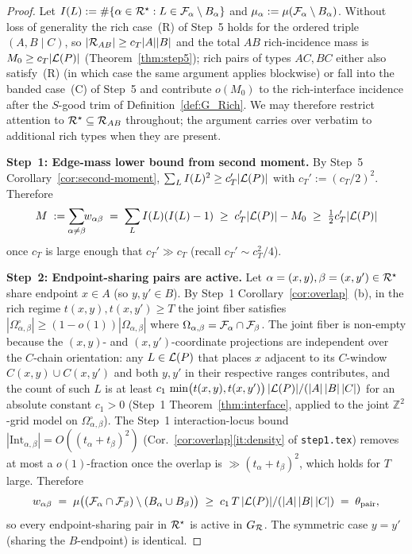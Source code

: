\begin{proof}
Let $I(L):=\#\{\alpha\in\mathcal{R}^\star: L\in\mathcal{F}_{\alpha}\setminus
B_\alpha\}$ and $\mu_\alpha:=\mu(\mathcal{F}_{\alpha}\setminus B_\alpha)$.
Without loss of generality the rich case~(R) of Step~5 holds for the
ordered triple $(A,B\mid C)$, so $|\mathcal{R}_{AB}|\ge c_T|A||B|$ and the
total $AB$ rich-incidence mass is $M_0\ge c_T|\mathcal{L}(P)|$
(Theorem~\ref{thm:step5}); rich pairs of types $AC,BC$ either also
satisfy~(R) (in which case the same argument applies blockwise) or
fall into the banded case~(C) of Step~5 and contribute $o(M_0)$ to
the rich-interface incidence after the $S$-good trim of
Definition~\ref{def:G_Rich}.  We may therefore restrict attention to
$\mathcal{R}^\star\subseteq\mathcal{R}_{AB}$ throughout; the argument carries
over verbatim to additional rich types when they are present.

\smallskip
\textbf{Step~1: Edge-mass lower bound from second moment.}
By Step~5 Corollary~\ref{cor:second-moment},
$\sum_L I(L)^2\ge c_T'|\mathcal{L}(P)|$ with $c_T':=(c_T/2)^2$.  Therefore
\begin{equation}\label{eq:gc-edge-mass}
  M\;:=\;\!\!\sum_{\alpha\ne\beta}\!\!w_{\alpha\beta}
  \;=\;\sum_L I(L)(I(L)-1)
  \;\ge\;c_T'|\mathcal{L}(P)|-M_0
  \;\ge\;\tfrac12 c_T'|\mathcal{L}(P)|
\end{equation}
once $c_T$ is large enough that $c_T'\gg c_T$ (recall
$c_T'\sim c_T^2/4$).

\smallskip
\textbf{Step~2: Endpoint-sharing pairs are active.}
Let $\alpha=(x,y),\beta=(x,y')\in\mathcal{R}^\star$ share endpoint
$x\in A$ (so $y,y'\in B$).  By Step~1
Corollary~\ref{cor:overlap}~(b), in the rich regime
$t(x,y),t(x,y')\ge T$ the joint fiber satisfies
$|\Omega_{\alpha,\beta}^{\circ}|\ge(1-o(1))|\Omega_{\alpha,\beta}|$
where $\Omega_{\alpha,\beta}=\mathcal{F}_{\alpha}\cap\mathcal{F}_{\beta}$.  The
joint fiber is non-empty because the $(x,y)$- and $(x,y')$-coordinate
projections are independent over the $C$-chain orientation: any
$L\in\mathcal{L}(P)$ that places $x$ adjacent to its $C$-window
$C(x,y)\cup C(x,y')$ and both $y,y'$ in their respective ranges
contributes, and the count of such $L$ is at least
$c_1\,\min\bigl(t(x,y),t(x,y')\bigr)\,|\mathcal{L}(P)|/(|A|\,|B|\,|C|)$
for an absolute constant $c_1>0$ (Step~1
Theorem~\ref{thm:interface}, applied to the joint
$\mathbb{Z}^2$-grid model on $\Omega^{\circ}_{\alpha,\beta}$).  The Step~1
interaction-locus bound $|\mathrm{Int}_{\alpha,\beta}|=O((t_\alpha+t_\beta)^2)$
(Cor.~\ref{cor:overlap}\ref{it:density} of \texttt{step1.tex})
removes at most a $o(1)$-fraction once the overlap is $\gg
(t_\alpha+t_\beta)^2$, which holds for $T$ large.  Therefore
\begin{equation}\label{eq:share-end-overlap}
  w_{\alpha\beta}\;=\;
  \mu\bigl((\mathcal{F}_{\alpha}\cap\mathcal{F}_{\beta})\setminus
  (B_\alpha\cup B_\beta)\bigr)
  \;\ge\; c_1\,T\,|\mathcal{L}(P)|/(|A|\,|B|\,|C|)\;=\;\theta_{\rm pair},
\end{equation}
so every endpoint-sharing pair in $\mathcal{R}^\star$ is active in
$G_{\mathcal{R}}$.  The symmetric case $y=y'$ (sharing the $B$-endpoint) is
identical.


\end{proof}
